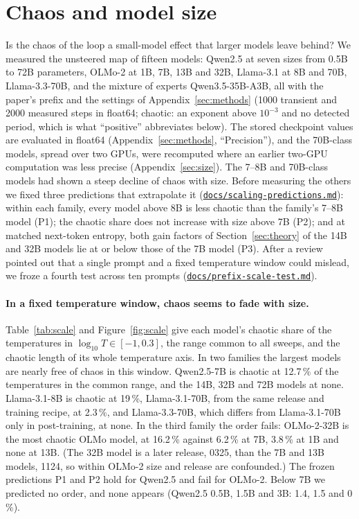 \documentclass[11pt,letterpaper]{article}
\newcommand{\repourl}{https://github.com/tdj28/neural-shrimp}
\newcommand{\reporef}{arxiv-v1}
\newcommand{\repo}[1]{\href{\repourl/blob/\reporef/#1}{\nolinkurl{#1}}}
\begin{document}
\section{Chaos and model size}
\label{sec:sizemain}
Is the chaos of the loop a small-model effect that larger models leave behind? We measured the unsteered map of
fifteen models: Qwen2.5 at seven sizes from 0.5B to 72B parameters, OLMo-2 at 1B, 7B, 13B and 32B, Llama-3.1 at 8B
and 70B, Llama-3.3-70B, and the mixture of experts Qwen3.5-35B-A3B, all with the paper's prefix and the settings of
Appendix~\ref{sec:methods} (1000 transient and 2000 measured steps in float64; chaotic: an exponent above $10^{-3}$ and
no detected period, which is what ``positive'' abbreviates below). The stored checkpoint values are evaluated in
float64 (Appendix~\ref{sec:methods}, ``Precision''), and the 70B-class models, spread over two GPUs, were recomputed
where an earlier two-GPU computation was less precise (Appendix~\ref{sec:size}). The 7--8B
and 70B-class models had shown a steep decline of chaos with size. Before measuring the others we fixed three
predictions that extrapolate it (\repo{docs/scaling-predictions.md}): within each family, every model above 8B is
less chaotic than the family's 7--8B model (P1); the chaotic share does not increase with size above 7B (P2); and at
matched next-token entropy, both gain factors of Section~\ref{sec:theory} of the 14B and 32B models lie at or below
those of the 7B model (P3). After a review pointed out that a single prompt and a fixed temperature window could
mislead, we froze a fourth test across ten prompts (\repo{docs/prefix-scale-test.md}).

\paragraph{In a fixed temperature window, chaos seems to fade with size.} Table~\ref{tab:scale} and
Figure~\ref{fig:scale} give each model's chaotic share of the temperatures in $\log_{10}T\in[-1,0.3]$, the range
common to all sweeps, and the chaotic length of its whole temperature axis. In two families the largest models are
nearly free of chaos in this window. Qwen2.5-7B is chaotic at
12.7\,\% of the temperatures in the common range, and the 14B, 32B and 72B models at none. Llama-3.1-8B is chaotic at
19\,\%, Llama-3.1-70B, from the same release and training recipe, at 2.3\,\%, and Llama-3.3-70B, which differs from
Llama-3.1-70B only in post-training, at none. In the third family the order fails: OLMo-2-32B is the most chaotic
OLMo model, at 16.2\,\% against 6.2\,\% at 7B, 3.8\,\% at 1B and none at 13B. (The 32B model is a later release,
0325, than the 7B and 13B models, 1124, so within OLMo-2 size and release are confounded.) The frozen predictions P1
and P2 hold for Qwen2.5 and fail for OLMo-2. Below 7B we predicted no order, and none appears (Qwen2.5 0.5B, 1.5B and
3B: 1.4, 1.5 and 0\,\%).
\end{document}
